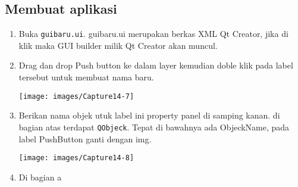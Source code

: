 \subsection{Membuat aplikasi}

\begin{enumerate}
	\item Buka \texttt{guibaru.ui}. guibaru.ui merupakan berkas XML Qt Creator, jika di klik maka GUI builder milik Qt Creator akan muncul.
	\item Drag dan drop Push button ke dalam layer kemudian doble klik pada label tersebut untuk membuat nama baru.
	
	\texttt{[image: images/Capture14-7]}
	
	\item Berikan nama objek utuk label ini property panel di samping kanan. di bagian atas terdapat \texttt{QObjeck}. Tepat di bawahnya ada ObjeckName, pada label PushButton ganti dengan img.
	
	\texttt{[image: images/Capture14-8]}
	
	\item Di bagian a
	
\end{enumerate}